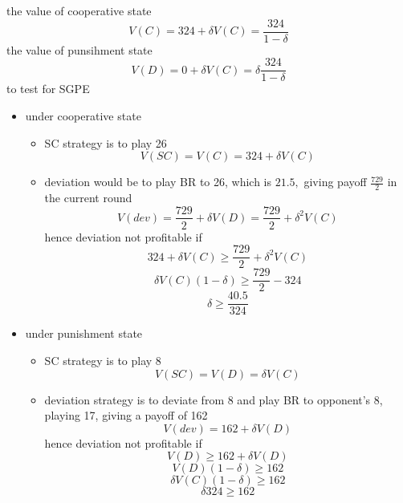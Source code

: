 \documentclass[a4paper, 10pt]{article}
\begin{document}
the value of cooperative state
\[
   V(C) = 324 + \delta V(C) = \frac{324}{1- \delta}
\]
the value of punsihment state
\[
   V(D) = 0 + \delta V(C) = \delta \frac{324}{1- \delta}
\]
to test for SGPE
\begin{itemize}
   \item under cooperative state
      \begin{itemize}
         \item SC strategy is to play 26
            \[
               V(SC) = V(C) = 324 + \delta V(C)
            \]
            
         \item deviation would be to play BR to 26, which is $21.5, $ giving payoff $\frac{729}{2}$ in the current round
            \[
               V(dev) = \frac{729}{2} + \delta V(D) = \frac{729}{2} + \delta^2 V(C)
            \]
            hence deviation not profitable if 
           \begin{equation}
              324 + \delta V(C) \ge \frac{729}{2} + \delta^2 V(C)
           \end{equation}	 
           \[
           \delta V(C) (1 - \delta) \ge \frac{729}{2} - 324 
           \]
           \[
              \delta \ge \frac{40.5}{324}
           \]
      \end{itemize}	
   \item under punishment state
      \begin{itemize}
         \item SC strategy is to play 8
            \[
               V(SC) = V(D) = \delta V(C)
            \]
          \item deviation strategy is to deviate from 8 and play BR to opponent's 8, playing 17, giving a payoff of 162
             \[
                V(dev) = 162 + \delta V(D)
             \]
            hence deviation not profitable if
           \begin{equation}
              V(D) \ge 162 + \delta V(D)
           \end{equation}	 
           \[
              V(D) (1- \delta) \ge 162
           \]
           \[
           \delta V(C) (1 - \delta) \ge 162
           \]
           \[
              \delta 324 \ge 162
           \]
      \end{itemize}	
\end{itemize}	
\end{document}
